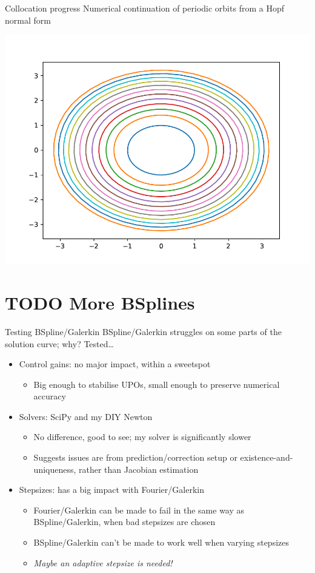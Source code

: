 \documentclass[presentation]{beamer}
\begin{document}
\begin{frame}[label={sec:org65918f8}]{Collocation progress}
Numerical continuation of periodic orbits from a Hopf normal form
\begin{center}
\includegraphics[width=.64\textwidth]{./collocation.pdf}
\end{center}
\end{frame}

\section{{\bfseries\sffamily TODO} More BSplines}
\label{sec:org67d9fd1}
\begin{frame}[label={sec:orgaebbf0b}]{Testing BSpline/Galerkin}
BSpline/Galerkin struggles on some parts of the solution curve; why? Tested\ldots{}
\begin{itemize}
\item Control gains: no major impact, within a sweetspot
\begin{itemize}
\item Big enough to stabilise UPOs, small enough to preserve numerical accuracy
\end{itemize}
\item Solvers: SciPy and my DIY Newton
\begin{itemize}
\item No difference, good to see; my solver is significantly slower
\item Suggests issues are from prediction/correction setup or existence-and-uniqueness, rather than Jacobian estimation
\end{itemize}
\item Stepsizes: has a big impact with Fourier/Galerkin
\begin{itemize}
\item Fourier/Galerkin can be made to fail in the same way as BSpline/Galerkin, when bad stepsizes are chosen
\item BSpline/Galerkin can't be made to work well when varying stepsizes
\item \emph{Maybe an adaptive stepsize is needed!}
\end{itemize}
\end{itemize}
\end{frame}
\end{document}
